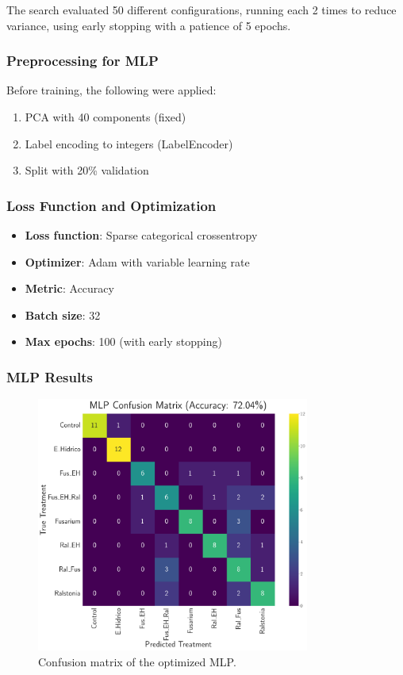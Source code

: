 \documentclass[12pt,a4paper]{article}
\begin{document}
The search evaluated 50 different configurations, running each 2 times to reduce variance, using early stopping with a patience of 5 epochs.

\subsubsection{Preprocessing for MLP}

Before training, the following were applied:
\begin{enumerate}
    \item PCA with 40 components (fixed)
    \item Label encoding to integers (LabelEncoder)
    \item Split with 20\% validation
\end{enumerate}

\subsubsection{Loss Function and Optimization}

\begin{itemize}
    \item \textbf{Loss function}: Sparse categorical crossentropy
    \item \textbf{Optimizer}: Adam with variable learning rate
    \item \textbf{Metric}: Accuracy
    \item \textbf{Batch size}: 32
    \item \textbf{Max epochs}: 100 (with early stopping)
\end{itemize}

\subsubsection{MLP Results}

\begin{figure}[H]
    \centering
    \includegraphics[width=0.8\textwidth]{Plots/Perceptron_Confusion_Matrix.png}
    \caption{Confusion matrix of the optimized MLP. }
    \label{fig:mlp_confusion}
\end{figure}
\end{document}
